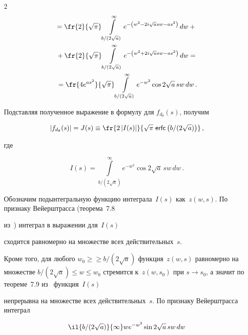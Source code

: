 \begin{multicols}{2}
\begin{multline*}
= \fr{2}{\sqrt{\pi}}\int\limits_{{b}/(2\sqrt{a})}^{\infty}e^{-\left(w^2 - 2i\sqrt{a}sw - as^2\right)}\,dw+{}\\


{}+


 \fr{2}{\sqrt{\pi}}\int\limits_{{b}/(2\sqrt{a})}^{\infty}e^{-\left(w^2 + 2i\sqrt{a}sw - as^2\right)}\,dw ={}\\


{}


= \fr{4e^{as^2}}{\sqrt{\pi}} \int\limits_{{b}/(2\sqrt{a})}^{\infty}e^{-w^2} \cos 2\sqrt{a}\,sw\, dw\,.


\end{multline*}


Подставляя полученное выражение в формулу для $f_{d_{\theta}}(s)$, получим


\begin{equation}


\label{l22}


\left|f_{d_{\theta}}(s)\right| = J(s) \equiv \fr{2\left|I(s)\right|}{\sqrt{\pi}\;{\sf erfc}\left(


b/(2\sqrt{a})\right)}\,,


\end{equation}


где


$$


I(s) = \int\limits_{{b}/(2\sqrt{a})}^{\infty} e^{-w^2} \cos 2\sqrt{a}\,s w\, dw\,.


$$


Обозначим подынтегральную функцию интеграла~$I(s)$ как~$z(w,s)$. По признаку Вейерштрасса (теорема~7.8 


из~\cite{matan}) интеграл в выражении для~$I(s)$\linebreak


сходится равномерно на множестве всех действительных~$s$. 


Кроме того, для любого $w_0 \geq$\linebreak $\geq {b}/(2\sqrt{a})$ функция~$z(w,s)$ равномерно на множестве ${b}/(2\sqrt{a}) \leq 


w \leq w_0$ стремится к~$z(w,s_0)$ при $s\to s_0$, а значит по теореме~7.9 из~\cite{matan} функция~$I(s)$ 


непрерывна на множестве всех действительных~$s$. По признаку Вейерштрасса интеграл


$$


\il{{b}/(2\sqrt{a})}{\infty} we^{-w^2} \sin 2\sqrt{a}\,sw\,dw


$$



\end{multicols}
